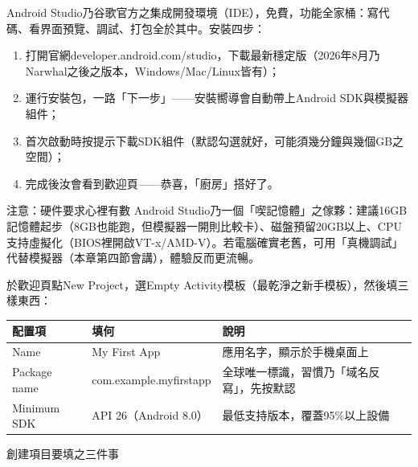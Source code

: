 


Android Studio乃谷歌官方之集成開發環境（IDE），免費，功能全家桶：寫代碼、看界面預覽、調試、打包全於其中。安裝四步：

\begin{enumerate}
  \item 打開官網developer.android.com/studio，下載最新穩定版（2026年8月乃Narwhal之後之版本，Windows/Mac/Linux皆有）；
  \item 運行安裝包，一路「下一步」——安裝嚮導會自動帶上Android SDK與模擬器組件；
  \item 首次啟動時按提示下載SDK組件（默認勾選就好，可能須幾分鐘與幾個GB之空間）；
  \item 完成後汝會看到歡迎頁——恭喜，「廚房」搭好了。
\end{enumerate}

\begin{tcbwarn}{注意：硬件要求心裡有數}
Android Studio乃一個「喫記憶體」之傢夥：建議16GB記憶體起步（8GB也能跑，但模擬器一開則比較卡）、磁盤預留20GB以上、CPU支持虛擬化（BIOS裡開啟VT-x/AMD-V）。若電腦確實老舊，可用「真機調試」代替模擬器（本章第四節會講），體驗反而更流暢。

\end{tcbwarn}


於歡迎頁點New Project，選Empty Activity模板（最乾淨之新手模板），然後填三樣東西：

\begin{center}
\begin{tabularx}{\linewidth}{|X|X|X|}
\hline
\textbf{配置項} & \textbf{填何} & \textbf{說明} \tabularnewline
\hline
Name & My First App & 應用名字，顯示於手機桌面上 \tabularnewline
Package name & com.example.myfirstapp & 全球唯一標識，習慣乃「域名反寫」，先按默認 \tabularnewline
Minimum SDK & API 26（Android 8.0） & 最低支持版本，覆蓋95\%以上設備 \tabularnewline
\hline
\end{tabularx}
\end{center}

\begin{center}\small\color{gray}創建項目要填之三件事\end{center}

